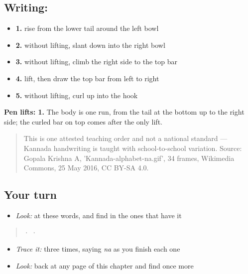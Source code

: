 \subsection*{Writing: }

\begin{itemize}
\raggedright
  \item \textbf{1.} rise from the lower tail around the left bowl
  \item \textbf{2.} without lifting, slant down into the right bowl
  \item \textbf{3.} without lifting, climb the right side to the top bar
  \item \textbf{4.} lift, then draw the top bar from left to right
  \item \textbf{5.} without lifting, curl up into the hook
\end{itemize}

\textbf{Pen lifts: 1.} The body is one run, from the tail at the bottom up to the right side; the curled bar on top comes after the only lift.

\begin{quote}
This is one attested teaching order and not a national standard — Kannada handwriting is taught with school-to-school variation. Source: Gopala Krishna A, 'Kannada-alphabet-na.gif', 34 frames, Wikimedia Commons, 25 May 2016, CC BY-SA 4.0.
\end{quote}

\subsection*{Your turn}
\begin{itemize}
\raggedright
  \item \emph{Look:} at these words, and find  in the ones that have it
\end{itemize}

\begin{quote}
  ·    ·  
\end{quote}

\begin{itemize}
\raggedright
  \item \emph{Trace it:}  three times, saying \emph{na} as you finish each one
  \item \emph{Look:} back at any page of this chapter and find  once more
\end{itemize}

